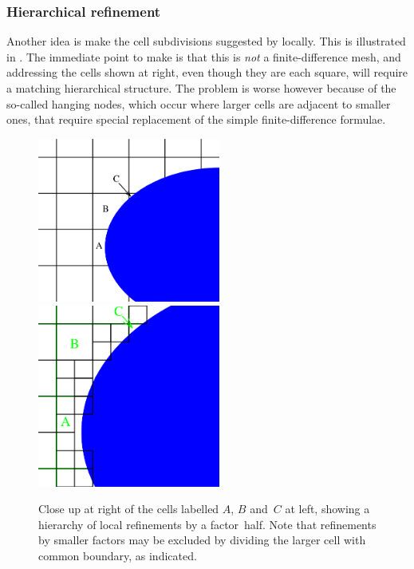 \subsubsection{Hierarchical refinement}\label{sec:hieref}
Another idea is make the cell subdivisions suggested by  locally. This is illustrated 
in . The immediate point to make is that this is \emph{not} a finite-difference mesh, and
addressing the cells shown at right, even though they are each square, will require a
matching hierarchical structure. The problem is worse however because of the so-called
hanging nodes, which occur where larger cells are adjacent to smaller ones, that
require special replacement of the simple finite-difference formulae.
\begin{figure}
\centerline{\includegraphics[width=6cm]{../pics/meshabc}
\includegraphics[width=6cm]{../pics/mfenabc}
}
\caption{Close up at right of the cells labelled $A$, $B$ and~$C$ at left, showing
a hierarchy of local refinements by a factor~half. Note that refinements by smaller
factors may be excluded by dividing the larger cell with common boundary,
as indicated.
\label{fig:mfenabc}}
\end{figure}

\clearpage
